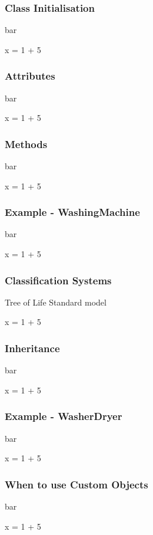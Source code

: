 \documentclass{beamer}
\begin{document}
\begin{frame}[fragile]
\frametitle{Class Initialisation}
bar
\begin{code}
x = 1 + 5
\end{code}
\end{frame}

\begin{frame}[fragile]
\frametitle{Attributes}
bar
\begin{code}
x = 1 + 5
\end{code}
\end{frame}

\begin{frame}[fragile]
\frametitle{Methods}
bar
\begin{code}
x = 1 + 5
\end{code}
\end{frame}

\begin{frame}[fragile]
\frametitle{Example - WashingMachine}
bar
\begin{code}
x = 1 + 5
\end{code}
\end{frame}


\begin{frame}[fragile]
\frametitle{Classification Systems}
Tree of Life
Standard model
\begin{code}
x = 1 + 5
\end{code}
\end{frame}

\begin{frame}[fragile]
\frametitle{Inheritance}
bar
\begin{code}
x = 1 + 5
\end{code}
\end{frame}

\begin{frame}[fragile]
\frametitle{Example - WasherDryer}
bar
\begin{code}
x = 1 + 5
\end{code}
\end{frame}

\begin{frame}[fragile]
\frametitle{When to use Custom Objects}
bar
\begin{code}
x = 1 + 5
\end{code}
\end{frame}
\end{document}
